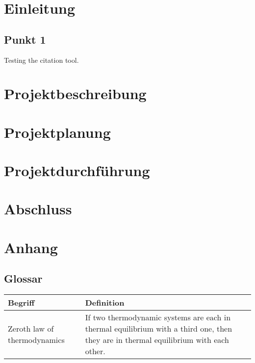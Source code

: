 \documentclass[a4paper]{article}
\begin{document}


\newpage

\tableofcontents

\newpage

\section{Einleitung}
\lipsum{}
\subsection{Punkt 1}

Testing the citation \cite{test} tool.

\section{Projektbeschreibung}
\lipsum{}

\section{Projektplanung}
\lipsum{}

\section{Projektdurchführung}

\section{Abschluss}

\section{Anhang}

\subsection{Glossar}
    \begin{tabularx}{\textwidth}{
            || X | X ||}
        \hline

        Begriff & Definition \\
        \hline\hline

        Zeroth law of thermodynamics & If two thermodynamic systems are each in thermal equilibrium with
        a third one, then they are in thermal equilibrium with each other. \\
        \hline

    \end{tabularx}

\printbibliography[heading=bibintoc]
\end{document}
